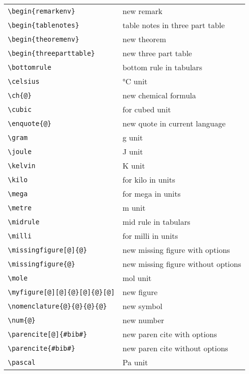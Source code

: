 \begin{longtable}{l p{}}
	\verb+\begin{remarkenv}+			&	new remark								\\
	\verb+\begin{tablenotes}+			&	table notes in three part table			\\
	\verb+\begin{theoremenv}+			&	new theorem								\\
	\verb+\begin{threeparttable}+		&	new three part table					\\
	\verb+\bottomrule+					&	bottom rule in tabulars					\\
	\verb+\celsius+						&	\unit{\celsius} unit					\\
	\verb+\ch{@}+						&	new chemical formula					\\
	\verb+\cubic+						&	for cubed unit							\\
	\verb+\enquote{@}+					&	new quote in current language			\\
	\verb+\gram+						&	\unit{\gram} unit						\\
	\verb+\joule+						&	\unit{\joule} unit						\\
	\verb+\kelvin+						&	\unit{\kelvin} unit						\\
	\verb+\kilo+						&	for kilo in units						\\
	\verb+\mega+						&	for mega in units						\\
	\verb+\metre+						&	\unit{\metre} unit						\\
	\verb+\midrule+						&	mid rule in tabulars					\\
	\verb+\milli+						&	for milli in units						\\
	\verb+\missingfigure[@]{@}+			&	new missing figure with options			\\
	\verb+\missingfigure{@}+			&	new missing figure without options		\\
	\verb+\mole+						&	\unit{\mole} unit						\\
	\verb+\myfigure[@][@]{@}[@]{@}[@]+	&	new figure								\\
	\verb+\nomenclature{@}{@}{@}{@}+	&	new symbol								\\
	\verb+\num{@}+						&	new number								\\
	\verb+\parencite[@]{#bib#}+			&	new paren cite with options				\\
	\verb+\parencite{#bib#}+			&	new paren cite without options			\\
	\verb+\pascal+						&	\unit{\pascal} unit						\\

\end{longtable}
